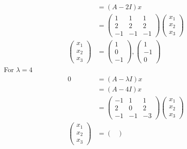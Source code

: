 \documentclass[13pt]{article}
\begin{document}
\begin{enumerate}[label=(\alph*),leftmargin=*]
\begin{align*}
      &= (A - 2I)x \\
      &=
        \begin{pmatrix}
          1 & 1 & 1 \\
          2 & 2 & 2 \\
          -1 & -1 & -1
        \end{pmatrix}
        \begin{pmatrix}
          x_1 \\
          x_2 \\
          x_3
        \end{pmatrix} \\
    \begin{pmatrix}
      x_1 \\
      x_2 \\
      x_3
    \end{pmatrix} &=
                    \begin{pmatrix}
                      1 \\
                      0 \\
                      -1
                    \end{pmatrix},
                    \begin{pmatrix}
                      1 \\
                      -1 \\
                      0
                    \end{pmatrix}
  \end{align*}
  For $\lambda = 4$
  \begin{align*}
    0 &= (A - \lambda I)x \\
      &= (A - 4I)x \\
      &=
        \begin{pmatrix}
          -1 & 1 & 1 \\
          2 & 0 & 2 \\
          -1 & -1 & -3
        \end{pmatrix}
        \begin{pmatrix}
          x_1 \\
          x_2 \\
          x_3
        \end{pmatrix} \\
    \begin{pmatrix}
      x_1 \\
      x_2 \\
      x_3
    \end{pmatrix} &=
                    \begin{pmatrix}

\end{pmatrix}
\end{align*}
\end{enumerate}
\end{document}
